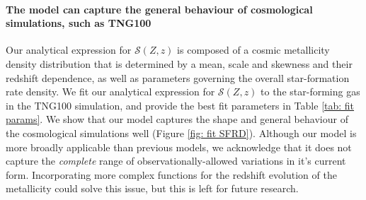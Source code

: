 \documentclass[linenumbers,twocolumn]{aastex631}
\newcommand{\SFRDzZ}{\ensuremath{\mathcal{S}(Z,z)}\xspace}
\begin{document}
\paragraph{The model can capture the general behaviour of cosmological simulations, such as TNG100}
Our analytical expression for \SFRDzZ is composed of a cosmic metallicity density distribution that is determined by a mean, scale and skewness and their redshift dependence, as well as parameters governing the overall star-formation rate density. We fit our analytical expression for \SFRDzZ to the star-forming gas in the TNG100 simulation, and provide the best fit parameters in Table \ref{tab: fit params}. 
We show that our model captures the shape and general behaviour of the cosmological simulations well (Figure \ref{fig: fit SFRD}). 
Although our model is more broadly applicable than previous models, we acknowledge that it does not capture the \textit{complete} range of observationally-allowed variations in it's current form. Incorporating more complex functions for the redshift evolution of the metallicity could solve this issue, but this is left for future research.    
\end{document}
